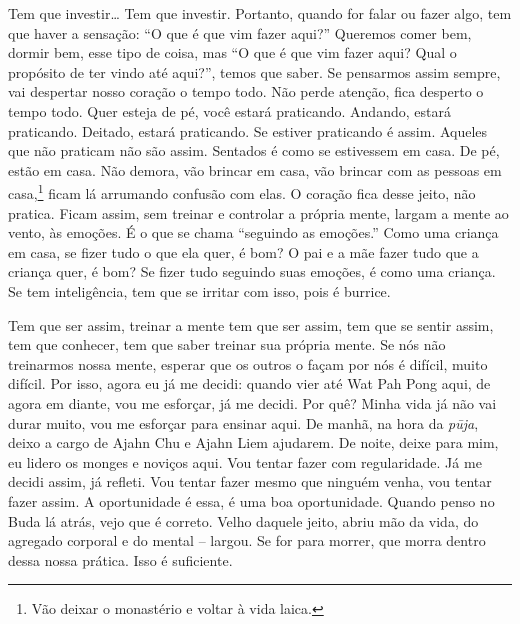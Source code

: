 Tem que investir… Tem que investir. Portanto, quando for falar ou
fazer algo, tem que haver a sensação: “O que é que vim fazer aqui?”
Queremos comer bem, dormir bem, esse tipo de coisa, mas “O que é que
vim fazer aqui? Qual o propósito de ter vindo até aqui?”, temos que
saber. Se pensarmos assim sempre, vai despertar nosso coração o tempo
todo. Não perde atenção, fica desperto o tempo todo. Quer esteja de pé,
você estará praticando. Andando, estará praticando. Deitado, estará
praticando. Se estiver praticando é assim. Aqueles que não praticam não
são assim. Sentados é como se estivessem em casa. De pé, estão em casa.
Não demora, vão brincar em casa, vão brincar com as pessoas em
casa,\footnote{Vão deixar o monastério e voltar à vida laica.} ficam lá
arrumando confusão com elas. O coração fica desse jeito, não pratica.
Ficam assim, sem treinar e controlar a própria mente, largam a mente ao
vento, às emoções. É o que se chama “seguindo as emoções.” Como uma
criança em casa, se fizer tudo o que ela quer, é bom? O pai e a mãe
fazer tudo que a criança quer, é bom? Se fizer tudo seguindo suas
emoções, é como uma criança. Se tem inteligência, tem que se irritar
com isso, pois é burrice. 

Tem que ser assim, treinar a mente tem que ser assim, tem que se
sentir assim, tem que conhecer, tem que saber treinar sua própria
mente. Se nós não treinarmos nossa mente, esperar que os outros o façam
por nós é difícil, muito difícil. Por isso, agora eu já me decidi:
quando vier até Wat Pah Pong aqui, de agora em diante, vou me esforçar,
já me decidi. Por quê? Minha vida já não vai durar muito, vou me
esforçar para ensinar aqui. De manhã, na hora da \textit{pūja}, deixo
a cargo de Ajahn Chu e Ajahn Liem ajudarem. De noite, deixe para mim,
eu lidero os monges e noviços aqui. Vou tentar fazer com regularidade.
Já me decidi assim, já refleti. Vou tentar fazer mesmo que ninguém
venha, vou tentar fazer assim. A oportunidade é essa, é uma boa
oportunidade. Quando penso no Buda lá atrás, vejo que é correto. Velho
daquele jeito, abriu mão da vida, do agregado corporal e do mental –
largou. Se for para morrer, que morra dentro dessa nossa prática. Isso
é suficiente.

